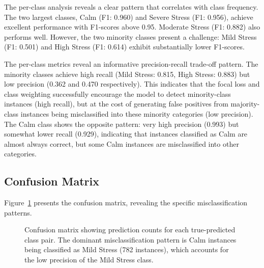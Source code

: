 \documentclass[12pt,letterpaper]{report}
\begin{document}
The per-class analysis reveals a clear pattern that correlates with class frequency. The two largest classes, Calm (F1: 0.960) and Severe Stress (F1: 0.956), achieve excellent performance with F1-scores above 0.95. Moderate Stress (F1: 0.882) also performs well. However, the two minority classes present a challenge: Mild Stress (F1: 0.501) and High Stress (F1: 0.614) exhibit substantially lower F1-scores.

The per-class metrics reveal an informative precision-recall trade-off pattern. The minority classes achieve high recall (Mild Stress: 0.815, High Stress: 0.883) but low precision (0.362 and 0.470 respectively). This indicates that the focal loss and class weighting successfully encourage the model to detect minority-class instances (high recall), but at the cost of generating false positives from majority-class instances being misclassified into these minority categories (low precision). The Calm class shows the opposite pattern: very high precision (0.993) but somewhat lower recall (0.929), indicating that instances classified as Calm are almost always correct, but some Calm instances are misclassified into other categories.

\subsection{Confusion Matrix}

Figure~\ref{fig:confusion_matrix} presents the confusion matrix, revealing the specific misclassification patterns.

\begin{figure}[H]
\centering
{}
\caption[Confusion matrix for NeuroFusionGPT]{Confusion matrix showing prediction counts for each true-predicted class pair. The dominant misclassification pattern is Calm instances being classified as Mild Stress (782 instances), which accounts for the low precision of the Mild Stress class.}
\label{fig:confusion_matrix}
\end{figure}
\end{document}
